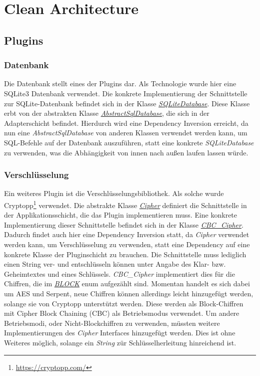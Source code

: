 \chapter{Clean Architecture}
\section{Plugins}
\subsection{Datenbank}
Die Datenbank stellt eines der Plugins dar. Als Technologie wurde hier eine SQLite3 Datenbank verwendet. Die konkrete Implementierung der Schnittstelle zur SQLite-Datenbank befindet sich in der Klasse \href{https://github.com/moorts/Morik/blob/main/src/plugins/database/SQLiteDatabase.h}{\textit{SQLiteDatabase}}. Diese Klasse erbt von der abstrakten Klasse \href{https://github.com/moorts/Morik/blob/main/src/adapters/database/AbstractSqlDatabase.h}{\textit{AbstractSqlDatabase}}, die sich in der Adapterschicht befindet. Hierdurch wird eine Dependency Inversion erreicht, da nun eine \textit{AbstractSqlDatabase} von anderen Klassen verwendet werden kann, um SQL-Befehle auf der Datenbank auszuführen, statt eine konkrete \textit{SQLiteDatabase} zu verwenden, was die Abhängigkeit von innen nach außen laufen lassen würde.

\subsection{Verschlüsselung}

Ein weiteres Plugin ist die Verschlüsselungsbibliothek. Als solche wurde Cryptopp\footnote{\url{https://cryptopp.com/}} verwendet. Die abstrakte Klasse \href{https://github.com/moorts/Morik/blob/main/src/application/Cipher.h}{\textit{Cipher}} definiert die Schnittstelle in der Applikationsschicht, die das Plugin implementieren muss. Eine konkrete Implementierung dieser Schnittstelle befindet sich in der Klasse \href{https://github.com/moorts/Morik/blob/main/src/plugins/encryption/CBC\_Cipher.h}{\textit{CBC\_Cipher}}. Dadurch findet auch hier eine Dependency Inversion statt, da \textit{Cipher} verwendet werden kann, um Verschlüsselung zu verwenden, statt eine Dependency auf eine konkrete Klasse der Pluginschicht zu brauchen. Die Schnittstelle muss lediglich einen String ver- und entschlüsseln können unter Angabe des Klar- bzw. Geheimtextes und eines Schlüssels. \textit{CBC\_Cipher} implementiert dies für die Chiffren, die im \href{https://github.com/moorts/Morik/blob/main/src/plugins/encryption/BLOCK.h}{\textit{BLOCK}} enum aufgezählt sind. Momentan handelt es sich dabei um AES und Serpent, neue Chiffren können allerdings leicht hinzugefügt werden, solange sie von Cryptopp unterstützt werden. Diese werden als Block-Chiffren mit Cipher Block Chaining (CBC) als Betriebsmodus verwendet. Um andere Betriebsmodi, oder Nicht-Blockchiffren zu verwenden, müssten weitere Implementierungen des \textit{Cipher} Interfaces hinzugefügt werden. Dies ist ohne Weiteres möglich, solange ein \textit{String} zür Schlüsselherleitung hinreichend ist.

